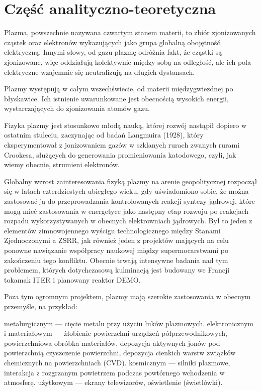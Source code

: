 \section[Część analityczno-teoretyczna]{Część analityczno-teoretyczna}\label{sec:theory} %
    Plazma, powszechnie nazywana czwartym stanem materii, to zbiór
    zjonizowanych cząstek oraz elektronów wykazujących jako grupa globalną
    obojętność elektryczną. Innymi słowy, od gazu plazmę odróżnia fakt, że
    cząstki są zjonizowane, więc oddziałują kolektywnie między sobą na
    odległość, ale ich pola elektryczne wzajemnie się neutralizują na długich
    dystansach.

    Plazmy występują w całym wszechświecie, od materii międzygwiezdnej po
    błyskawice.  Ich istnienie uwarunkowane jest obecnością wysokich energii,
    wystarczających do zjonizowania atomów gazu.

    Fizyka plazmy jest stosunkowo młodą nauką, której rozwój nastąpił dopiero w
    ostatnim stuleciu, zaczynając od badań Langmuira (1928), który
    eksperymentował z jonizowaniem gazów w szklanych rurach zwanych rurami
    Crookesa, służących do generowania promieniowania katodowego, czyli, jak
    wiemy obecnie, strumieni elektronów.\cite{langmuir}

    Globalny wzrost zainteresowania fizyką plazmy na arenie geopolitycznej
    rozpoczął się w latach czterdziestych ubiegłego wieku, gdy uświadomiono sobie,
    że można zastosować ją do przeprowadzania kontrolowanych reakcji syntezy
    jądrowej,
    które mogą mieć zastosowania w energetyce jako następny etap rozwoju po
    reakcjach rozpadu wykorzystywanych w obecnych elektrowniach jądrowych.
    Był to jeden z elementów zimnowojennego wyścigu technologicznego między Stanami
    Zjednoczonymi a ZSRR, jak również jeden z projektów mających na celu ponowne
    nawiązanie współpracy naukowej między supermocarstwami po zakończeniu tego
    konfliktu. Obecnie trwają intensywne badania nad tym problemem, których
    dotychczasową kulminacją jest budowany we Francji tokamak ITER i planowany reaktor DEMO\@.

    Poza tym ogromnym projektem, plazmy mają szerokie zastosowania w obecnym
    przemyśle, na przykład:
    \begin{itemize}
        \itemi{} metalurgicznym --- cięcie metalu przy użyciu łuków plazmowych.
        \itemi{} elektronicznym i materiałowym --- żłobienie powierzchni urządzeń
            półprzewodnikowych, powierzchniowa obróbka materiałów, depozycja
            aktywnych jonów pod powierzchnią czyszczenie powierzchni, depozycja
            cienkich warstw związków chemicznych na powierzchniach (CVD).
        \itemi{} kosmicznym --- silniki plazmowe, interakcja z rozgrzanym powietrzem
            podczas powtórnego wchodzenia w atmosferę.
        \itemi{} użytkowym --- ekrany telewizorów, oświetlenie (świetlówki).
    \end{itemize}

